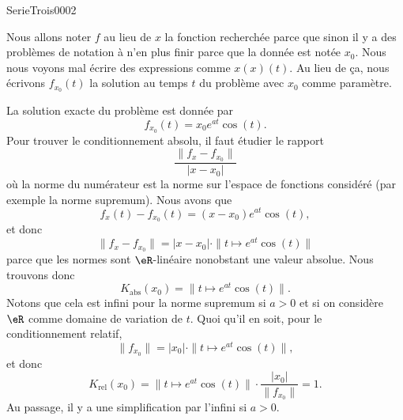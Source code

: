 
\begin{corrige}{SerieTrois0002}

	Nous allons noter $f$ au lieu de $x$ la fonction recherchée parce que sinon il y a des problèmes de notation à n'en plus finir parce que la donnée est notée $x_0$. Nous nous voyons mal écrire des expressions comme $x(x)(t)$. Au lieu de ça, nous écrivons $f_{x_0}(t)$ la solution au temps $t$ du problème avec $x_0$ comme paramètre.

	La solution exacte du problème est donnée par
	\begin{equation}
		f_{x_0}(t)=x_0 e^{at}\cos(t).
	\end{equation}
	Pour trouver le conditionnement absolu, il faut étudier le rapport
	\begin{equation}
		\frac{ \| f_x-f_{x_0} \| }{ | x-x_0 | }
	\end{equation}
	où la norme du numérateur est la norme sur l'espace de fonctions considéré (par exemple la norme supremum). Nous avons que
	\begin{equation}
		f_x(t)-f_{x_0}(t)=(x-x_0) e^{at}\cos(t),
	\end{equation}
	et donc
	\begin{equation}
		\| f_x-f_{x_0} \|=| x-x_0 |\cdot\| t\mapsto  e^{at}\cos(t) \|
	\end{equation}
	parce que les normes sont $\eR$-linéaire nonobstant une valeur absolue. Nous trouvons donc
	\begin{equation}
		K_{\text{abs}}(x_0)=\| t\mapsto  e^{at}\cos(t) \|.
	\end{equation}
	Notons que cela est infini pour la norme supremum si $a>0$ et si on considère $\eR$ comme domaine de variation de $t$. Quoi qu'il en soit, pour le conditionnement relatif,
	\begin{equation}
		\| f_{x_0} \|=| x_0 |\cdot\| t\mapsto e^{at}\cos(t) \|,
	\end{equation}
	et donc
	\begin{equation}
		K_{\text{rel}}(x_0)=\| t\mapsto  e^{at}\cos(t) \|\cdot\frac{ | x_0 | }{ \| f_{x_0} \| }  =1.
	\end{equation}
	Au passage, il y a une simplification par l'infini si $a>0$.

\end{corrige}
